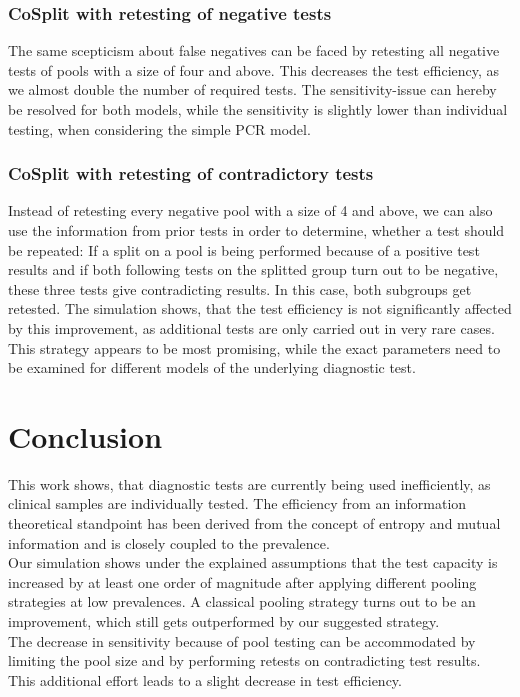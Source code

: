\documentclass[fleqn,10pt]{wlscirep}
\begin{document}
	
	\subsubsection{CoSplit with retesting of negative tests}
	The same scepticism about false negatives can be faced by retesting all negative tests of pools with a size of four and above. This decreases the test efficiency, as we almost double the number of required tests. The sensitivity-issue can hereby be resolved for both models, while the sensitivity is slightly lower than individual testing, when considering the simple PCR model.
	
	\subsubsection{CoSplit with retesting of contradictory tests}
	Instead of retesting every negative pool with a size of 4 and above, we can also use the information from prior tests in order to determine, whether a test should be repeated: If a split on a pool is being performed because of a positive test results and if both following tests on the splitted group turn out to be negative, these three tests give contradicting results. In this case, both subgroups get retested. The simulation shows, that the test efficiency is not significantly affected by this improvement, as additional tests are only carried out in very rare cases. This strategy appears to be most promising, while the exact parameters need to be examined for different models of the underlying diagnostic test.
	
	\section{Conclusion}
	This work shows, that diagnostic tests are currently being used inefficiently, as clinical samples are individually tested. The efficiency from an information theoretical standpoint has been derived from the concept of entropy and mutual information and is closely coupled to the prevalence.\\
	
	Our simulation shows under the explained assumptions that the test capacity is increased by at least one order of magnitude after applying different pooling strategies at low prevalences. A classical pooling strategy turns out to be an improvement, which still gets outperformed by our suggested strategy. \\
	
	
	The decrease in sensitivity because of pool testing can be accommodated by limiting the pool size and by performing retests on contradicting test results. This additional effort leads to a slight decrease in test efficiency.\\
	
\end{document}
